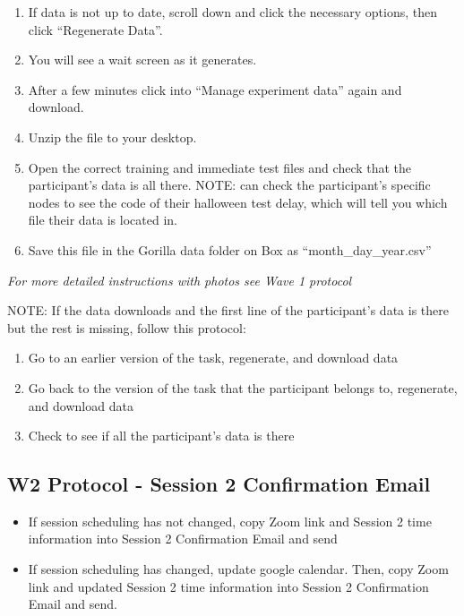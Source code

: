 \documentclass[]{book}
\begin{document}
\begin{enumerate}
\def\labelenumi{\arabic{enumi}.}
\setcounter{enumi}{2}
\item
  If data is not up to date, scroll down and click the necessary options, then click ``Regenerate Data''.
\item
  You will see a wait screen as it generates.
\item
  After a few minutes click into ``Manage experiment data'' again and download.
\item
  Unzip the file to your desktop.
\item
  Open the correct training and immediate test files and check that the participant's data is all there. NOTE: can check the participant's specific nodes to see the code of their halloween test delay, which will tell you which file their data is located in.
\item
  Save this file in the Gorilla data folder on Box as ``month\_day\_year.csv''
\end{enumerate}

\emph{For more detailed instructions with photos see Wave 1 protocol}

NOTE: If the data downloads and the first line of the participant's data is there but the rest is missing, follow this protocol:

\begin{enumerate}
\def\labelenumi{\arabic{enumi}.}
\item
  Go to an earlier version of the task, regenerate, and download data
\item
  Go back to the version of the task that the participant belongs to, regenerate, and download data
\item
  Check to see if all the participant's data is there
\end{enumerate}

\hypertarget{w2-protocol---session-2-confirmation-email}{%
\subsection{W2 Protocol - Session 2 Confirmation Email}\label{w2-protocol---session-2-confirmation-email}}

\begin{itemize}
\item
  If session scheduling has not changed, copy Zoom link and Session 2 time information into Session 2 Confirmation Email and send
\item
  If session scheduling has changed, update google calendar. Then, copy Zoom link and updated Session 2 time information into Session 2 Confirmation Email and send.
\end{itemize}
\end{document}
